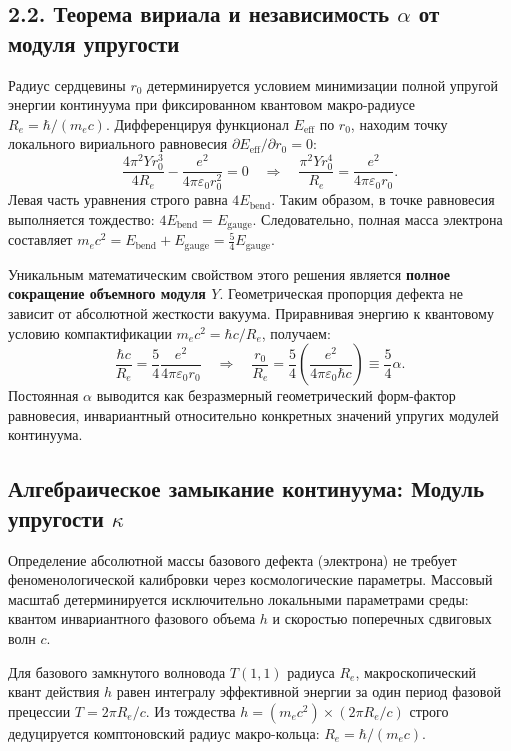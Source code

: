\documentclass[11pt,a4paper]{article}
\begin{document}
	\subsection{2.2. Теорема вириала и независимость $\alpha$ от модуля упругости}
	Радиус сердцевины $r_0$ детерминируется условием минимизации полной упругой энергии континуума при фиксированном квантовом макро-радиусе $R_e = \hbar / (m_e c)$.
	Дифференцируя функционал $E_{\text{eff}}$ по $r_0$, находим точку локального вириального равновесия $\partial E_{\text{eff}} / \partial r_0 = 0$:
	\begin{equation}
		\frac{4 \pi^2 Y r_0^3}{4R_e} - \frac{e^2}{4\pi\varepsilon_0 r_0^2} = 0 \quad \Longrightarrow \quad \frac{\pi^2 Y r_0^4}{R_e} = \frac{e^2}{4\pi\varepsilon_0 r_0}.
	\end{equation}
	Левая часть уравнения строго равна $4 E_{\text{bend}}$. Таким образом, в точке равновесия выполняется тождество: $4 E_{\text{bend}} = E_{\text{gauge}}$.
	Следовательно, полная масса электрона составляет $m_e c^2 = E_{\text{bend}} + E_{\text{gauge}} = \frac{5}{4} E_{\text{gauge}}$. 
	
	Уникальным математическим свойством этого решения является \textbf{полное сокращение объемного модуля $Y$}. Геометрическая пропорция дефекта не зависит от абсолютной жесткости вакуума. Приравнивая энергию к квантовому условию компактификации $m_e c^2 = \hbar c / R_e$, получаем:
	\begin{equation}
		\frac{\hbar c}{R_e} = \frac{5}{4} \frac{e^2}{4\pi\varepsilon_0 r_0} \quad \Longrightarrow \quad \frac{r_0}{R_e} = \frac{5}{4} \left( \frac{e^2}{4\pi\varepsilon_0 \hbar c} \right) \equiv \frac{5}{4} \alpha.
	\end{equation}
	Постоянная $\alpha$ выводится как безразмерный геометрический форм-фактор равновесия, инвариантный относительно конкретных значений упругих модулей континуума.
	
	\subsection{Алгебраическое замыкание континуума: Модуль упругости $\kappa$}
	Определение абсолютной массы базового дефекта (электрона) не требует феноменологической калибровки через космологические параметры. Массовый масштаб детерминируется исключительно локальными параметрами среды: квантом инвариантного фазового объема $h$ и скоростью поперечных сдвиговых волн $c$.
	
	Для базового замкнутого волновода $T(1,1)$ радиуса $R_e$, макроскопический квант действия $h$ равен интегралу эффективной энергии за один период фазовой прецессии $T = 2\pi R_e/c$. Из тождества $h = (m_e c^2) \times (2\pi R_e/c)$ строго дедуцируется комптоновский радиус макро-кольца: $R_e = \hbar / (m_e c)$. 
	
\end{document}
